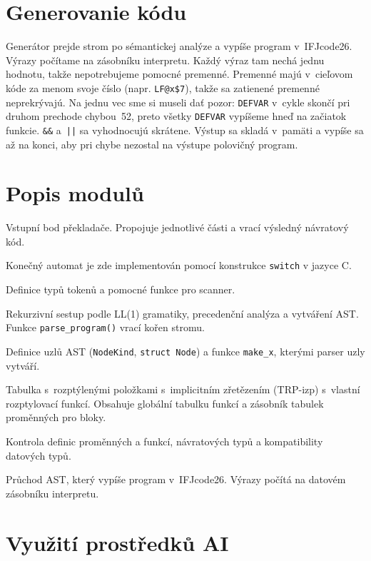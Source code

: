 \documentclass[a4paper,11pt]{article}
\newcommand{\id}[1]{\texttt{#1}}
\newcommand{\term}[1]{\texttt{#1}}
\begin{document}
\section{Generovanie kódu}\label{sec:codegen}
Generátor prejde strom po sémantickej analýze a vypíše program v~IFJcode26.
Výrazy počítame na zásobníku interpretu. Každý výraz tam nechá jednu hodnotu,
takže nepotrebujeme pomocné premenné. Premenné majú v~cieľovom kóde za menom
svoje číslo (napr. \id{LF@x\$7}), takže sa zatienené premenné neprekrývajú. Na
jednu vec sme si museli dať pozor: \id{DEFVAR} v~cykle skončí pri druhom
prechode chybou~52, preto všetky \id{DEFVAR} vypíšeme hneď na začiatok
funkcie. \term{\&\&} a~\term{||} sa vyhodnocujú skrátene. Výstup sa skladá
v~pamäti a vypíše sa až na konci, aby pri chybe nezostal na výstupe
polovičný program.


\section{Popis modulů}

\begin{description}[style=nextline]
  \item[\id{main.c}] Vstupní bod překladače. Propojuje jednotlivé části a vrací výsledný návratový kód.
  \item[\id{scanner.c}] Konečný automat je zde implementován pomocí konstrukce \id{switch} v jazyce C.
  \item[\id{token.c/h}] Definice typů tokenů a pomocné funkce pro scanner.
  \item[\id{parser.c/h}] Rekurzivní sestup podle LL(1) gramatiky, precedenční analýza a vytváření AST. Funkce \id{parse\_program()} vrací kořen stromu.
  \item[\id{tree.c/h}] Definice uzlů AST (\id{NodeKind}, \id{struct Node}) a funkce \id{make\_x}, kterými parser uzly vytváří.
  \item[\id{symtable.c/h}] Tabulka s~rozptýlenými položkami s~implicitním zřetězením (TRP-izp) s~vlastní rozptylovací funkcí. Obsahuje globální tabulku funkcí a zásobník tabulek proměnných pro bloky.
  \item[\id{analyzer.c/h}] Kontrola definic proměnných a funkcí, návratových typů a kompatibility datových typů.
  \item[\id{codegen.c/h}] Průchod AST, který vypíše program v~IFJcode26. Výrazy počítá na datovém zásobníku interpretu.
\end{description}

\section{Využití prostředků AI}
\end{document}
